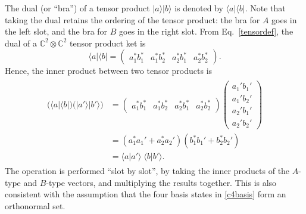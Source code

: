 \documentclass[prx,12pt]{revtex4-2}
\begin{document}
The dual (or ``bra'') of a tensor product $|a\rangle |b\rangle$ is
denoted by $\langle a| \langle b|$.  Note that taking the dual retains
the ordering of the tensor product: the bra for $A$ goes in the left
slot, and the bra for $B$ goes in the right slot.  From
Eq.~\eqref{tensordef}, the dual of a $\mathbb{C}^2\otimes\mathbb{C}^2$
tensor product ket is
\begin{equation}
  \langle a| \langle b| =
  \begin{pmatrix} a_1^* b_1^* & a_1^* b_2^*
    & a_2^* b_1^* & a_2^* b_2^* \end{pmatrix}.
\end{equation}
Hence, the inner product between two tensor products is
\begin{align}
  \begin{aligned}
  \Big(\langle a| \langle b|\Big)
  \Big(|a'\rangle |b'\rangle\Big)
  &= \begin{pmatrix} a_1^* b_1^* & a_1^* b_2^*
    & a_2^* b_1^* & a_2^* b_2^* \end{pmatrix}
  \begin{pmatrix} a_1' b_1' \\ a_1' b_2' \\
    a_2' b_1' \\ a_2' b_2' \end{pmatrix} \\
  &= (a_1^*a_1' + a_2^*a_2') (b_1^*b_1' + b_2^*b_2') \\
  &= \langle a|a'\rangle \; \langle b|b'\rangle.  
  \end{aligned}
  \label{inprodex}
\end{align}
The operation is performed ``slot by slot'', by taking the inner
products of the $A$-type and $B$-type vectors, and multiplying the
results together.  This is also consistent with the assumption that
the four basis states in \eqref{c4basis} form an orthonormal set.
\end{document}

